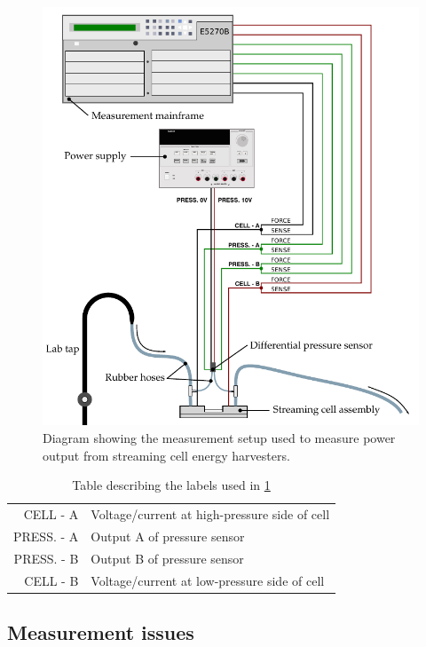     \begin{figure}
        \includegraphics{content/pt1/01-PowerHarvesting/graphics/measurementSetup}
        \caption{\label{fig:measurementSetup}Diagram showing the measurement setup used to measure power output from streaming cell energy harvesters.}
    \end{figure}

    \begin{table}
        \centering
        \begin{tabular}{r|l}
        CELL - A & Voltage/current at high-pressure side of cell\\
        PRESS. - A & Output A of pressure sensor\\
        PRESS. - B & Output B of pressure sensor\\
        CELL - B & Voltage/current at low-pressure side of cell
        \end{tabular}
        \caption{\label{tab:measurementSetup_legend}Table describing the labels used in \ref{fig:measurementSetup}}
    \end{table}


  \subsection{Measurement issues}


